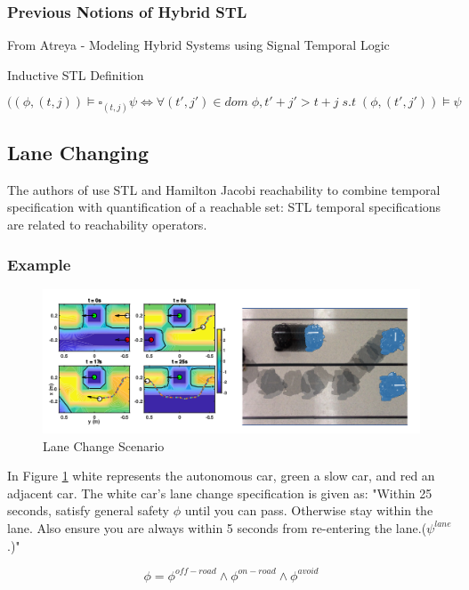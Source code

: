 \documentclass{article}
\theoremstyle{definition}
\begin{document}
\subsubsection{Previous Notions of Hybrid STL}
From Atreya - Modeling Hybrid Systems using Signal Temporal Logic
\begin{center}
    Inductive STL Definition
\end{center}

\begin{equation}
            ((\phi,(t,j)) \models \square_{(t,j)} \psi \Leftrightarrow \forall (t',j') \in dom\;\phi, t'+j' > t + j\;s.t\;(\phi, (t',j')) \models \psi
\end{equation}




\clearpage
\appendix
\subsection{Lane Changing}
The authors of \cite{chen_signal_nodate} use STL and Hamilton Jacobi reachability to combine temporal specification with quantification of a reachable set: STL temporal specifications are related to reachability operators.

\subsubsection{Example}
\begin{figure}[H] 
\centering
\includegraphics[width=4.5in]{Figures/chen_lanechange.png}
\caption{Lane Change Scenario}
\label{fig:chen_lane_change}
\end{figure}
In Figure \ref{fig:chen_lane_change} white represents the autonomous car, green a slow car, and red an adjacent car. The white car's lane change specification is given as: "Within 25 seconds, satisfy general safety $\phi$ until you can pass. Otherwise stay within the lane. Also ensure you are always within 5 seconds from re-entering the lane.($\psi^{lane}$.)"

\begin{equation}
    \phi = \phi^{off-road} \land \phi^{on-road} \land \phi^{avoid} 
\end{equation}
\end{document}
